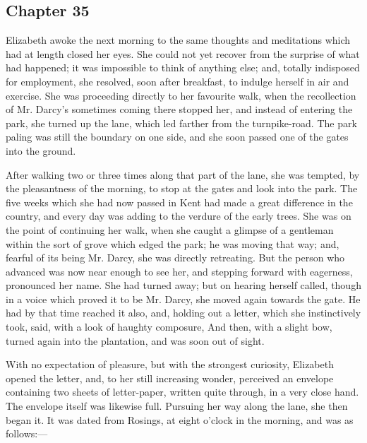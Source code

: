 \subsection[chapter-35]{\useURL[url35][][][]\from[url35] Chapter 35}

Elizabeth awoke the next morning to the same thoughts and meditations which had at length closed her eyes. She could not yet recover from the surprise of what had happened; it was impossible to think of anything else; and, totally indisposed for employment, she resolved, soon after breakfast, to indulge herself in air and exercise. She was proceeding directly to her favourite walk, when the recollection of Mr. Darcy's sometimes coming there stopped her, and instead of entering the park, she turned up the lane, which led farther from the turnpike-road. The park paling was still the boundary on one side, and she soon passed one of the gates into the ground.

After walking two or three times along that part of the lane, she was tempted, by the pleasantness of the morning, to stop at the gates and look into the park. The five weeks which she had now passed in Kent had made a great difference in the country, and every day was adding to the verdure of the early trees. She was on the point of continuing her walk, when she caught a glimpse of a gentleman within the sort of grove which edged the park; he was moving that way; and, fearful of its being Mr. Darcy, she was directly retreating. But the person who advanced was now near enough to see her, and stepping forward with eagerness, pronounced her name. She had turned away; but on hearing herself called, though in a voice which proved it to be Mr. Darcy, she moved again towards the gate. He had by that time reached it also, and, holding out a letter, which she instinctively took, said, with a look of haughty composure,  And then, with a slight bow, turned again into the plantation, and was soon out of sight.

With no expectation of pleasure, but with the strongest curiosity, Elizabeth opened the letter, and, to her still increasing wonder, perceived an envelope containing two sheets of letter-paper, written quite through, in a very close hand. The envelope itself was likewise full. Pursuing her way along the lane, she then began it. It was dated from Rosings, at eight o'clock in the morning, and was as follows:---

